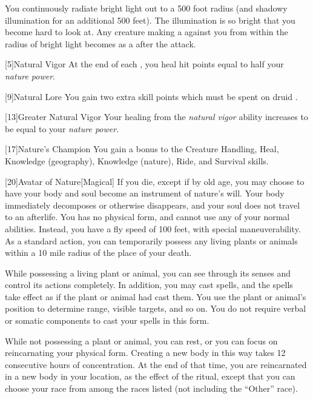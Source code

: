         You continuously radiate bright light out to a 500 foot radius (and shadowy illumination for an additional 500 feet).
        The illumination is so bright that you become hard to look at.
        Any creature making a  against you from within the radius of bright light becomes \dazzled as a  after the attack.

        [5]{Natural Vigor}
        At the end of each , you heal hit points equal to half your \textit{nature power}.

        [9]{Natural Lore}
        You gain two extra skill points which must be spent on druid .

        [13]{Greater Natural Vigor}
        Your healing from the \textit{natural vigor} ability increases to be equal to your \textit{nature power}.

        [17]{Nature's Champion}
        You gain a  bonus to the Creature Handling, Heal, Knowledge (geography), Knowledge (nature), Ride, and Survival skills.

        [20]{Avatar of Nature}[Magical]
        If you die, except if by old age, you may choose to have your body and soul become an instrument of nature's will.
        Your body immediately decomposes or otherwise disappears, and your soul does not travel to an afterlife.
        You has no physical form, and cannot use any of your normal abilities.
        Instead, you have a fly speed of 100 feet, with special maneuverability.
        As a standard action, you can temporarily possess any living plants or animals within a 10 mile radius of the place of your death.

        While possessing a living plant or animal, you can see through its senses and control its actions completely.
        In addition, you may cast spells, and the spells take effect as if the plant or animal had cast them.
        You use the plant or animal's position to determine range, visible targets, and so on.
        You do not require verbal or somatic components to cast your spells in this form.

        While not possessing a plant or animal, you can rest, or you can focus on reincarnating your physical form.
        Creating a new body in this way takes 12 consecutive hours of concentration.
        At the end of that time, you are reincarnated in a new body in your location, as the effect of the  ritual, except that you can choose your race from among the races listed (not including the ``Other'' race).

